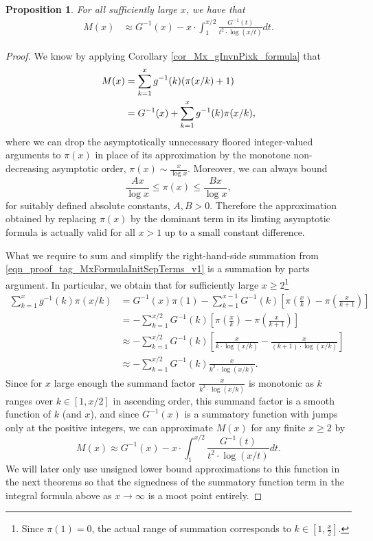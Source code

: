 \documentclass[11pt,reqno,a4letter]{article}
\numberwithin{figure}{section}
\numberwithin{table}{section}
\theoremstyle{plain}
\newtheorem{prop}[theorem]{Proposition}
\numberwithin{theorem}{section}
\theoremstyle{definition}
\begin{document}
\begin{prop}
\label{prop_Mx_SBP_IntegralFormula} 
For all sufficiently large $x$, we have that 
\begin{align} 
\label{eqn_pf_tag_v2-restated_v2} 
M(x) & \approx G^{-1}(x) - x \cdot \int_1^{x/2} \frac{G^{-1}(t)}{t^2 \cdot \log(x/t)} dt. 
\end{align} 
\end{prop} 
\begin{proof} 
We know by applying Corollary \ref{cor_Mx_gInvnPixk_formula} that 
\begin{align} 
\notag
M(x) & = \sum_{k=1}^{x} g^{-1}(k) (\pi(x/k)+1) \\ 
\label{eqn_proof_tag_MxFormulaInitSepTerms_v1} 
     & = G^{-1}(x) + \sum_{k=1}^{x} g^{-1}(k) \pi(x/k), 
\end{align} 
where we can drop the asymptotically unnecessary floored integer-valued arguments to $\pi(x)$ in place of 
its approximation by the monotone non-decreasing asymptotic order, $\pi(x) \sim \frac{x}{\log x}$. 
Moreover, we can always 
bound $$\frac{Ax}{\log x} \leq \pi(x) \leq \frac{Bx}{\log x},$$ for suitably defined 
absolute constants, $A,B > 0$. 
Therefore the approximation obtained by replacing $\pi(x)$ by the dominant term in its 
limting asymptotic formula is actually valid for all $x > 1$ up to a small constant difference. 

What we require to sum and simplify the right-hand-side summation from 
\eqref{eqn_proof_tag_MxFormulaInitSepTerms_v1} is a summation by parts argument. 
In particular, we obtain that for sufficiently large 
$x \geq 2$\footnote{
     Since $\pi(1) = 0$, the actual range of summation corresponds to 
     $k \in \left[1, \frac{x}{2}\right]$. 
}
\begin{align*} 
\sum_{k=1}^{x} g^{-1}(k) \pi(x/k) & = G^{-1}(x) \pi(1) - \sum_{k=1}^{x-1} G^{-1}(k) \left[ 
     \pi\left(\frac{x}{k}\right) - \pi\left(\frac{x}{k+1}\right)\right] \\ 
     & = -\sum_{k=1}^{x/2} G^{-1}(k) \left[ 
     \pi\left(\frac{x}{k}\right) - \pi\left(\frac{x}{k+1}\right)\right] \\ 
     & \approx -\sum_{k=1}^{x/2} G^{-1}(k) \left[ 
     \frac{x}{k \cdot \log(x/k)} - \frac{x}{(k+1) \cdot \log(x/k)}\right] \\ 
     & \approx -\sum_{k=1}^{x/2} G^{-1}(k) \frac{x}{k^2 \cdot \log(x/k)}. 
\end{align*} 
Since for $x$ large enough the summand factor $\frac{x}{k^2 \cdot \log(x/k)}$ 
is monotonic as $k$ ranges over $k \in [1, x/2]$ in ascending order, this 
summand factor is a smooth function of $k$ (and $x$), and since $G^{-1}(x)$ is 
a summatory function with jumps only at the positive integers, we can approximate 
$M(x)$ for any finite $x \geq 2$ by 
\[
M(x) \approx G^{-1}(x) - x \cdot \int_1^{x/2} \frac{G^{-1}(t)}{t^2 \cdot \log(x/t)} dt. 
\]
We will later only use unsigned lower bound approximations to this function in the next theorems so that 
the signedness of the summatory function term in the integral formula above 
as $x \rightarrow \infty$ is a moot point entirely. 
\end{proof} 
\end{document}
